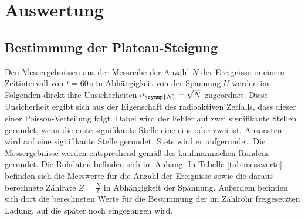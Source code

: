 \section{Auswertung}
\label{sec:Auswertung}

\subsection{Bestimmung der Plateau-Steigung}
\label{subsec:plateau}

Den Messergebnissen aus der Messreihe der Anzahl $N$ der Ereignisse in einem Zeitintervall
von $t=60\,$s in Abhängigkeit von der Spannung $U$ werden im Folgenden direkt ihre
Unsicherheiten $\sigma_{\symup{N}}=\sqrt{N}$ zugeordnet. Diese Unsicherheit ergibt
sich aus der Eigenschaft des radioaktiven Zerfalls, dass dieser einer Poisson-Verteilung
folgt. Dabei wird der Fehler auf zwei signifikante Stellen gerundet, wenn die
erste signifikante Stelle eine eins oder zwei ist. Ansonsten wird auf eine signifikante
Stelle gerundet. Stets wird er aufgerundet. Die Messergebnisse werden entsprechend
gemäß des kaufmännischen Rundens gerundet. Die Rohdaten befinden sich im Anhang.
In Tabelle \ref{tab:messwerte} befinden sich die Messwerte für die Anzahl der
Ereignisse sowie die daraus berechnete Zählrate $Z=\frac{N}{t}$ in Abhängigkeit
der Spannung. Außerdem befinden sich dort die berechneten Werte für die Bestimmung
der im Zählrohr freigesetzten Ladung, auf die später noch eingegangen
wird.

